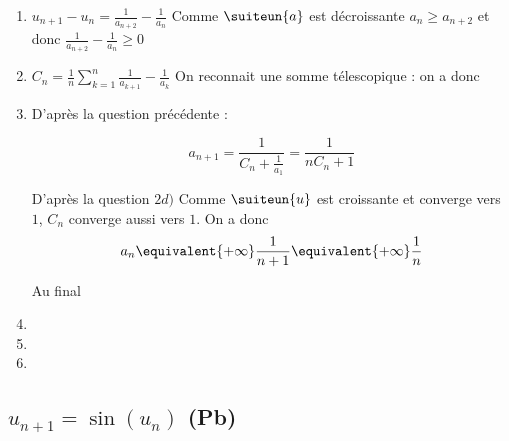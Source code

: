 \begin{correction}
\begin{enumerate}
\begin{enumerate}
\item $u_{n+1}-u_n= \frac{1}{a_{n+2}}- \frac{1}{a_n}$
Comme $\suiteun{a}$  est décroissante $a_n\geq a_{n+2}$ et donc 
$\frac{1}{a_{n+2}}- \frac{1}{a_n}\geq  0$ 


\item $C_n =\frac{1}{n }\sum_{k=1}^n \frac{1}{a_{k+1}} -\frac{1}{a_k} $
On reconnait une somme télescopique : on a donc 



\item D'après la question précédente : 

$$a_{n+1} = \frac{1}{C_n +\frac{1}{a_1}}= \frac{1}{nC_n +1}$$

D'après la question $2d)$ Comme $\suiteun{u}$ est croissante et converge  vers $1$, $C_n$ converge aussi vers $1$. 
On a donc $$a_n \equivalent{+\infty} \frac{1}{n+1}\equivalent{+\infty} \frac{1}{n}$$

Au final 



\item 
\item 
\item 
\end{enumerate}
\end{enumerate}
\end{correction}



\subsection{$u_{n+1}=\sin(u_n)$ (Pb)}

